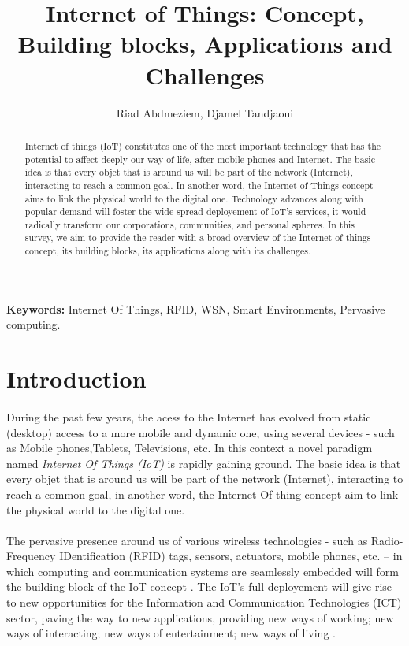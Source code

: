 \documentclass[10pt, twocolumn]{article}
\title{Internet of Things: Concept, Building blocks, Applications and Challenges}
\author{Riad Abdmeziem, Djamel Tandjaoui}
\begin{document}
\maketitle
{\bf Keywords: } Internet Of Things, RFID, WSN, Smart Environments, Pervasive computing.
\begin{abstract}
Internet of things (IoT) constitutes one of the most important technology that has the potential to affect deeply our way of life, after mobile phones and Internet. The basic idea is that every objet that is around us will be part of the network (Internet), interacting to reach a common goal. In another word, the Internet of Things concept aims to link the physical world to the digital one. Technology advances along with popular demand will foster the wide spread deployement of IoT's services, it would radically transform our corporations, communities, and personal spheres. In this survey, we aim to provide the reader with a broad overview of the Internet of things concept, its building blocks, its applications along with its challenges.   
\end{abstract}
\section{Introduction}
\paragraph{}
During the past few years, the acess to the Internet has evolved from static (desktop) access to a more mobile and dynamic one, using several devices - such as Mobile phones,Tablets, Televisions, etc. In this context a novel paradigm named \emph{Internet Of Things (IoT)} is rapidly gaining ground. The basic idea is that every objet that is around us will be part of the network (Internet), interacting to reach a common goal, in another word, the Internet Of thing concept aim to link the physical world to the digital one.
\paragraph{}
The pervasive presence around us of various wireless technologies - such as Radio-Frequency IDentification (RFID)
tags, sensors, actuators, mobile phones, etc. – in which computing and communication systems are seamlessly embedded will form the building block of the IoT concept \cite{ref1}. The IoT's full deployement will give rise to new opportunities for the Information and Communication Technologies (ICT) sector, paving the way to new applications, providing new ways of  working; new ways of interacting; new ways of entertainment; new ways of living \cite{ref2}.
\end{document}
